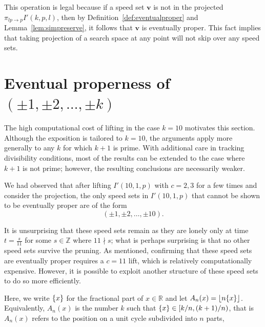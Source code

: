 \documentclass[11pt]{amsart}
\DeclarePairedDelimiter\fracpart{\{}{\}}
\newcommand{\R}{\mathbb{R}}
\newcommand{\Z}{\mathbb{Z}}
\newcommand{\vbf}{\mathbf{v}}
\theoremstyle{definition}
\theoremstyle{remark}
\begin{document}
This operation is legal because if a speed set $\vbf$ is not in the projected $\pi_{lp \to p} I'(k, p, l)$, then by Definition~\ref{def:eventualproper} 
and Lemma~\ref{lem:simpreserve}, it follows that $\vbf$ is eventually proper.
This fact implies that taking projection of a search space at any point will not skip over any speed sets.

\section{Eventual properness of
  \texorpdfstring{$(\pm1,\pm2,\ldots,\pm k)$}{(+/-1, +/-2, ..., +/-k)}
} \label{sec:onetok}
The high computational cost of lifting in the case $k=10$ motivates this section.
Although the exposition is tailored to $k=10$, the arguments apply more generally to any $k$
for which $k+1$ is prime.
With additional care in tracking divisibility conditions, most of the results can be extended
to the case where $k+1$ is not prime; however, the resulting conclusions are necessarily weaker.

We had observed that after lifting $I'(10, 1, p)$ with $c=2,3$ for a few times and consider the projection, 
the only speed sets in $I'(10, 1, p)$ that cannot be shown to be eventually proper are of the form 
\[ ( \pm1, \pm2, \ldots, \pm10 ).\]

It is unsurprising that these speed sets remain as they are lonely only at time $t=\frac{s}{11}$ for some $s \in \Z$ where
$11\nmid s$; what is perhaps surprising is that no other speed sets survive the pruning.
As mentioned, confirming that these speed sets are eventually proper requires a $c=11$ lift, which is relatively computationally expensive.
However, it is possible to exploit another structure of these speed sets to do so more efficiently.

Here, we write $\fracpart{x}$ for the fractional part of $x \in \R$ and let $A_n(x)=\lfloor n \fracpart{x}\rfloor$.
Equivalently, $A_n(x)$ is the number $k$ such that $\fracpart{x} \in [k/n, (k+1)/n)$, that is $A_n(x)$ refers to the
position on a unit cycle subdivided into $n$ parts,
\end{document}
